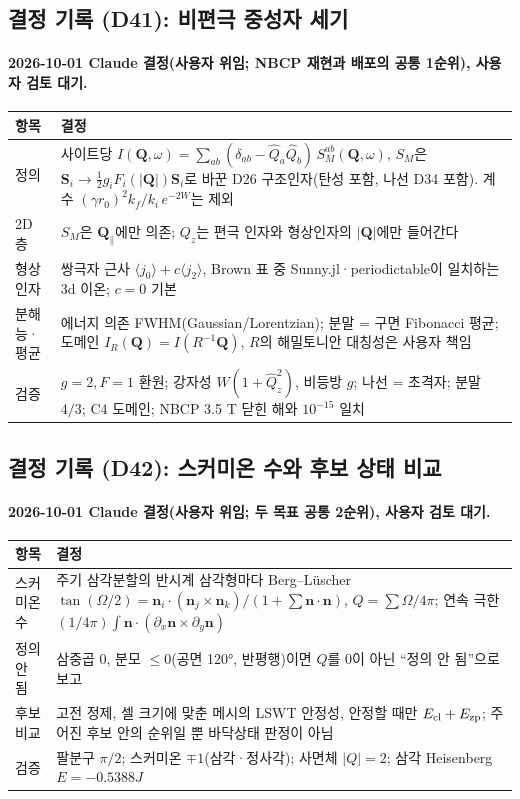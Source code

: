 \subsection{결정 기록 (D41): 비편극 중성자 세기}\label{decisions-d41-neutron}
\begingroup%
  \framesubtitle{2026-10-01 Claude 결정(사용자 위임; NBCP 재현과 배포의 공통 1순위), 사용자 검토 대기.}
  \small\renewcommand{\arraystretch}{1.12}
  \begin{tabularx}{\textwidth}{@{}P{3.0cm}Y@{}}
    \toprule
    항목 & 결정 \\
    \midrule
    정의 & 사이트당 $I(\mathbf Q,\omega)=\sum_{ab}(\delta_{ab}-\hat Q_a\hat Q_b)\,S_M^{ab}(\mathbf Q,\omega)$, $S_M$은 $\mathbf S_i\to\tfrac12 g_i F_i(|\mathbf Q|)\mathbf S_i$로 바꾼 D26 구조인자(탄성 포함, 나선 D34 포함). 계수 $(\gamma r_0)^2 k_f/k_i\,e^{-2W}$는 제외 \\
    2D 층 & $S_M$은 $\mathbf Q_\parallel$에만 의존; $Q_z$는 편극 인자와 형상인자의 $|\mathbf Q|$에만 들어간다 \\
    형상인자 & 쌍극자 근사 $\langle j_0\rangle+c\langle j_2\rangle$, Brown 표 중 Sunny.jl·periodictable이 일치하는 3d 이온; $c=0$ 기본 \\
    분해능·평균 & 에너지 의존 FWHM(Gaussian/Lorentzian); 분말 = 구면 Fibonacci 평균; 도메인 $I_R(\mathbf Q)=I(R^{-1}\mathbf Q)$, $R$의 해밀토니안 대칭성은 사용자 책임 \\
    검증 & $g=2,F=1$ 환원; 강자성 $W(1+\hat Q_z^2)$, 비등방 $g$; 나선 = 초격자; 분말 $4/3$; C4 도메인; NBCP 3.5 T 닫힌 해와 $10^{-15}$ 일치 \\
    \bottomrule
  \end{tabularx}
\endgroup


\subsection{결정 기록 (D42): 스커미온 수와 후보 상태 비교}\label{decisions-d42-texture}
\begingroup%
  \framesubtitle{2026-10-01 Claude 결정(사용자 위임; 두 목표 공통 2순위), 사용자 검토 대기.}
  \small\renewcommand{\arraystretch}{1.12}
  \begin{tabularx}{\textwidth}{@{}P{3.0cm}Y@{}}
    \toprule
    항목 & 결정 \\
    \midrule
    스커미온 수 & 주기 삼각분할의 반시계 삼각형마다 Berg--L\"uscher $\tan(\Omega/2)=\mathbf n_i\cdot(\mathbf n_j\times\mathbf n_k)/(1+\sum\mathbf n\cdot\mathbf n)$, $Q=\sum\Omega/4\pi$; 연속 극한 $(1/4\pi)\int\mathbf n\cdot(\partial_x\mathbf n\times\partial_y\mathbf n)$ \\
    정의 안 됨 & 삼중곱 0, 분모 $\le 0$(공면 120°, 반평행)이면 $Q$를 0이 아닌 ``정의 안 됨''으로 보고 \\
    후보 비교 & 고전 정제, 셀 크기에 맞춘 메시의 LSWT 안정성, 안정할 때만 $E_{\rm cl}+E_{\rm zp}$; 주어진 후보 안의 순위일 뿐 바닥상태 판정이 아님 \\
    검증 & 팔분구 $\pi/2$; 스커미온 $\mp1$(삼각·정사각); 사면체 $|Q|=2$; 삼각 Heisenberg $E=-0.5388J$ \\
    \bottomrule
  \end{tabularx}
\endgroup


